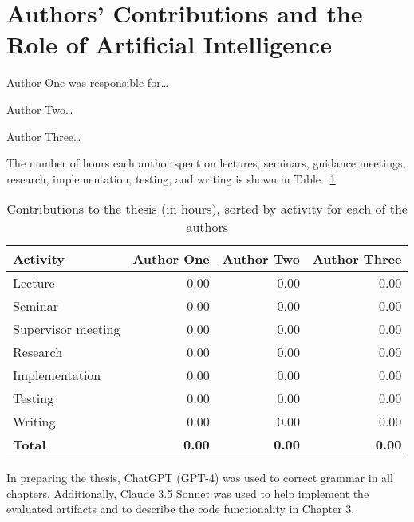 \section{Authors' Contributions and the Role of Artificial Intelligence}
\label{sec:introduction}

Author One was responsible for\ldots

Author Two\ldots

Author Three\ldots

The number of hours each author spent on lectures, seminars, guidance
meetings, research, implementation, testing, and writing is shown in
Table ~\ref{tab:combined_hours}

\begin{table}[h]
\caption{Contributions to the thesis (in hours), sorted by activity for each of the authors}
\centering
\renewcommand{\arraystretch}{1.2}
\begin{tabular}{|l|r|r|r|}
\hline
\textbf{Activity} & \textbf{Author One} & \textbf{Author Two} & \textbf{Author Three} \\
\hline
Lecture & 0.00 & 0.00 & 0.00 \\
Seminar & 0.00 & 0.00 & 0.00 \\
Supervisor meeting & 0.00 & 0.00 & 0.00 \\
Research & 0.00 & 0.00 & 0.00 \\
Implementation & 0.00 & 0.00 & 0.00 \\
Testing & 0.00 & 0.00 & 0.00 \\
Writing & 0.00 & 0.00 & 0.00 \\
\hline
\textbf{Total} & \textbf{0.00} & \textbf{0.00} & \textbf{0.00} \\
\hline
\end{tabular}
\label{tab:combined_hours}
\end{table}

In preparing the thesis, ChatGPT (GPT-4) was used to correct grammar
in all chapters. Additionally, Claude 3.5 Sonnet was used to help
implement the evaluated artifacts and to describe the code
functionality in Chapter 3.

